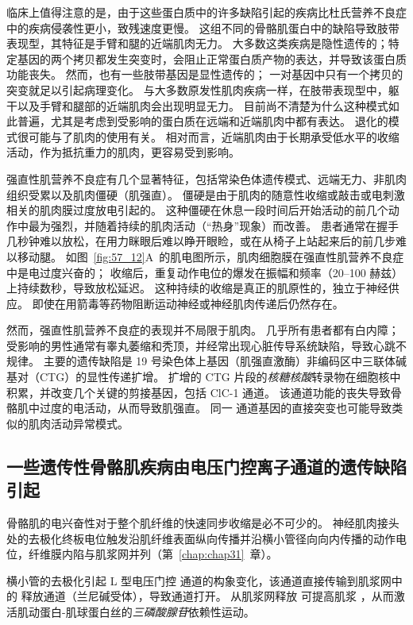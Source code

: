 临床上值得注意的是，由于这些蛋白质中的许多缺陷引起的疾病比杜氏营养不良症中的疾病侵袭性更小，致残速度更慢。
这组不同的骨骼肌蛋白中的缺陷导致肢带表现型，其特征是手臂和腿的近端肌肉无力。
大多数这类疾病是隐性遗传的；特定基因的两个拷贝都发生突变时，会阻止正常蛋白质产物的表达，并导致该蛋白质功能丧失。
然而，也有一些肢带基因是显性遗传的；
一对基因中只有一个拷贝的突变就足以引起病理变化。
与大多数原发性肌肉疾病一样，在肢带表现型中，躯干以及手臂和腿部的近端肌肉会出现明显无力。
目前尚不清楚为什么这种模式如此普遍，尤其是考虑到受影响的蛋白质在远端和近端肌肉中都有表达。
退化的模式很可能与了肌肉的使用有关。
相对而言，近端肌肉由于长期承受低水平的收缩活动，作为抵抗重力的肌肉，更容易受到影响。


强直性肌营养不良症有几个显著特征，包括常染色体遗传模式、远端无力、非肌肉组织受累以及肌肉僵硬（肌强直）。
僵硬是由于肌肉的随意性收缩或敲击或电刺激相关的肌肉膜过度放电引起的。
这种僵硬在休息一段时间后开始活动的前几个动作中最为强烈，并随着持续的肌肉活动（“热身”现象）而改善。
患者通常在握手几秒钟难以放松，在用力眯眼后难以睁开眼睑，或在从椅子上站起来后的前几步难以移动腿。
如图~\ref{fig:57_12}A~的肌电图所示，肌肉细胞膜在强直性肌营养不良症中是电过度兴奋的；
收缩后，重复动作电位的爆发在振幅和频率（20–100 赫兹）上持续数秒，导致放松延迟。
这种持续的收缩是真正的肌原性的，独立于神经供应。
即使在用箭毒等药物阻断运动神经或神经肌肉传递后仍然存在。


然而，强直性肌营养不良症的表现并不局限于肌肉。
几乎所有患者都有白内障；
受影响的男性通常有睾丸萎缩和秃顶，并经常出现心脏传导系统缺陷，导致心跳不规律。
主要的遗传缺陷是 19 号染色体上基因（肌强直激酶）非编码区中三联体碱基对（CTG）的显性传递扩增。
扩增的 CTG 片段的\textit{核糖核酸}转录物在细胞核中积累，并改变几个关键的剪接基因，包括 ClC-1  通道。
该通道功能的丧失导致骨骼肌中过度的电活动，从而导致肌强直。
同一  通道基因的直接突变也可能导致类似的肌肉活动异常模式。



\subsection{一些遗传性骨骼肌疾病由电压门控离子通道的遗传缺陷引起}

骨骼肌的电兴奋性对于整个肌纤维的快速同步收缩是必不可少的。
神经肌肉接头处的去极化终板电位触发沿肌纤维表面纵向传播并沿横小管径向向内传播的动作电位，纤维膜内陷与肌浆网并列（第~\ref{chap:chap31}~章）。


横小管的去极化引起 L 型电压门控  通道的构象变化，该通道直接传输到肌浆网中的  释放通道（兰尼碱受体），导致通道打开。
从肌浆网释放  可提高肌浆 ，从而激活肌动蛋白-肌球蛋白丝的\textit{三磷酸腺苷}依赖性运动。


